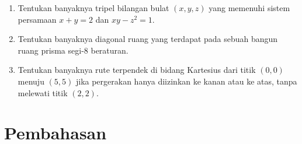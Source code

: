 \documentclass{article}
\begin{document}
\begin{enumerate}
\item Tentukan banyaknya tripel bilangan bulat $(x, y, z)$ yang memenuhi sistem persamaan $x + y = 2$ dan $xy - z^2 = 1$.

\item Tentukan banyaknya diagonal ruang yang terdapat pada sebuah bangun ruang prisma segi-8 beraturan.

\item Tentukan banyaknya rute terpendek di bidang Kartesius dari titik $(0,0)$ menuju $(5,5)$ jika pergerakan hanya diizinkan ke kanan atau ke atas, tanpa melewati titik $(2,2)$.
\end{enumerate}

\section*{Pembahasan}
\end{document}
